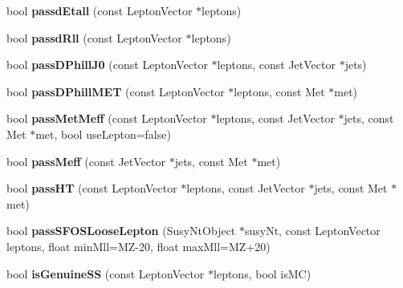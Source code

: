 \begin{DoxyCompactItemize}
\item 
\hypertarget{classSusySelection_a10d79039a2afaa20cf9927a45493825c}{
bool {\bfseries passdEtall} (const LeptonVector $\ast$leptons)}
\label{classSusySelection_a10d79039a2afaa20cf9927a45493825c}

\item 
\hypertarget{classSusySelection_ac08f98b3eff272a41c880a1706ae81ad}{
bool {\bfseries passdRll} (const LeptonVector $\ast$leptons)}
\label{classSusySelection_ac08f98b3eff272a41c880a1706ae81ad}

\item 
\hypertarget{classSusySelection_a045502e543160aee5e53201bff399386}{
bool {\bfseries passDPhillJ0} (const LeptonVector $\ast$leptons, const JetVector $\ast$jets)}
\label{classSusySelection_a045502e543160aee5e53201bff399386}

\item 
\hypertarget{classSusySelection_a3ab5d1b5cc09cf2acb913982f29d4191}{
bool {\bfseries passDPhillMET} (const LeptonVector $\ast$leptons, const Met $\ast$met)}
\label{classSusySelection_a3ab5d1b5cc09cf2acb913982f29d4191}

\item 
\hypertarget{classSusySelection_a01e725d50fc174908ffe297394c09458}{
bool {\bfseries passMetMeff} (const LeptonVector $\ast$leptons, const JetVector $\ast$jets, const Met $\ast$met, bool useLepton=false)}
\label{classSusySelection_a01e725d50fc174908ffe297394c09458}

\item 
\hypertarget{classSusySelection_a9376f2f9a4764e3bf8b4c28aae415aed}{
bool {\bfseries passMeff} (const JetVector $\ast$jets, const Met $\ast$met)}
\label{classSusySelection_a9376f2f9a4764e3bf8b4c28aae415aed}

\item 
\hypertarget{classSusySelection_a79d7bf361223e86d0e702916c6a5871f}{
bool {\bfseries passHT} (const LeptonVector $\ast$leptons, const JetVector $\ast$jets, const Met $\ast$met)}
\label{classSusySelection_a79d7bf361223e86d0e702916c6a5871f}

\item 
\hypertarget{classSusySelection_a40a645ea96cea584198f5f3cedfbf576}{
bool {\bfseries passSFOSLooseLepton} (SusyNtObject $\ast$susyNt, const LeptonVector leptons, float minMll=MZ-\/20, float maxMll=MZ+20)}
\label{classSusySelection_a40a645ea96cea584198f5f3cedfbf576}

\item 
\hypertarget{classSusySelection_ac991ad8ea8a6936dcd2a9637a477f76b}{
bool {\bfseries isGenuineSS} (const LeptonVector $\ast$leptons, bool isMC)}
\label{classSusySelection_ac991ad8ea8a6936dcd2a9637a477f76b}


\end{DoxyCompactItemize}
